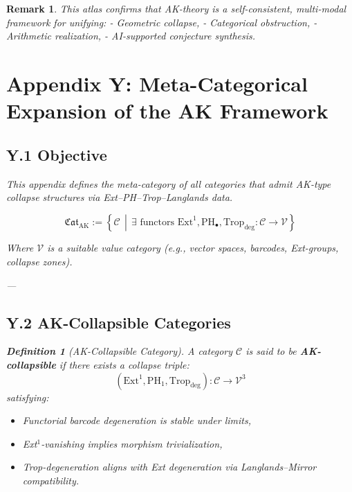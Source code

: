 \documentclass[11pt]{article}
\newtheorem{definition}[theorem]{Definition}
\newtheorem{remark}[theorem]{Remark}
\begin{document}
\begin{remark}
This atlas confirms that AK-theory is a self-consistent, multi-modal framework for unifying:
- Geometric collapse,
- Categorical obstruction,
- Arithmetic realization,
- AI-supported conjecture synthesis.


\section*{Appendix Y: Meta-Categorical Expansion of the AK Framework}

\subsection*{Y.1 Objective}

This appendix defines the meta-category of all categories  
that admit AK-type collapse structures via Ext–PH–Trop–Langlands data.

\[
\boxed{
\mathfrak{Cat}_{\mathrm{AK}} := 
\left\{
  \mathcal{C} \,\middle|\,
  \exists \text{ functors } \mathrm{Ext}^1, \mathrm{PH}_\bullet, \mathrm{Trop}_{\mathrm{deg}} : \mathcal{C} \to \mathcal{V}
\right\}
}
\]

Where \( \mathcal{V} \) is a suitable value category (e.g., vector spaces, barcodes, Ext-groups, collapse zones).

---

\subsection*{Y.2 AK-Collapsible Categories}

\begin{definition}[AK-Collapsible Category]
A category \( \mathcal{C} \) is said to be \textbf{AK-collapsible} if there exists a collapse triple:
\[
(\mathrm{Ext}^1, \mathrm{PH}_1, \mathrm{Trop}_{\mathrm{deg}}): \mathcal{C} \to \mathcal{V}^3
\]
satisfying:
\begin{itemize}
  \item Functorial barcode degeneration is stable under limits,
  \item Ext$^1$-vanishing implies morphism trivialization,
  \item Trop-degeneration aligns with Ext degeneration via Langlands–Mirror compatibility.
\end{itemize}
\end{definition}


\end{remark}
\end{document}
